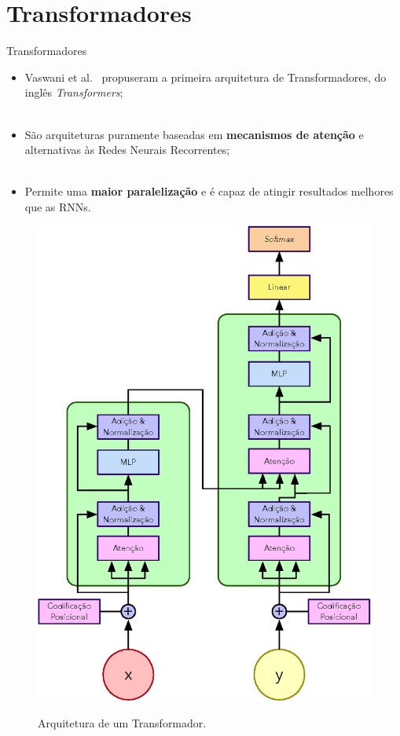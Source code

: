 \section{Transformadores}
\label{s.transformer}

\begin{frame}{Transformadores}
	\begin{itemize}
		\justifying
		\item Vaswani et al.~\cite{Vaswani:17} propuseram a primeira arquitetura de Transformadores, do inglês \emph{Transformers};
		\\~\\
		\item São arquiteturas puramente baseadas em \textbf{mecanismos de atenção} e alternativas às Redes Neurais Recorrentes;	
		\\~\\
		\item Permite uma \textbf{maior paralelização} e é capaz de atingir resultados melhores que as RNNs.
	\end{itemize}
\end{frame}

\begin{frame}
	\vspace*{0.5cm}
	\begin{figure}[!ht]
		\centering
		\includegraphics[scale=0.45]{figs/transformer.eps}	
		\label{f.transformer}
		\caption{Arquitetura de um Transformador.}
	\end{figure}
\end{frame}


